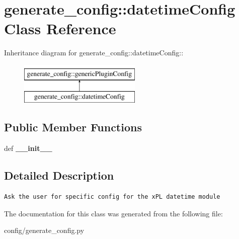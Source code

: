 \hypertarget{classgenerate__config_1_1datetimeConfig}{
\section{generate\_\-config::datetimeConfig Class Reference}
\label{classgenerate__config_1_1datetimeConfig}
}
Inheritance diagram for generate\_\-config::datetimeConfig::\begin{figure}[H]
\begin{center}
\leavevmode
\includegraphics[height=2cm]{classgenerate__config_1_1datetimeConfig}
\end{center}
\end{figure}
\subsection*{Public Member Functions}
\begin{CompactItemize}
\item 
\hypertarget{classgenerate__config_1_1datetimeConfig_84bd0d1f10cb05b3513a3da208cab7bb}{
def \textbf{\_\-\_\-init\_\-\_\-}}
\label{classgenerate__config_1_1datetimeConfig_84bd0d1f10cb05b3513a3da208cab7bb}

\end{CompactItemize}


\subsection{Detailed Description}


\footnotesize\begin{verbatim}
Ask the user for specific config for the xPL datetime module
\end{verbatim}
\normalsize
 

The documentation for this class was generated from the following file:\begin{CompactItemize}
\item 
config/generate\_\-config.py\end{CompactItemize}
